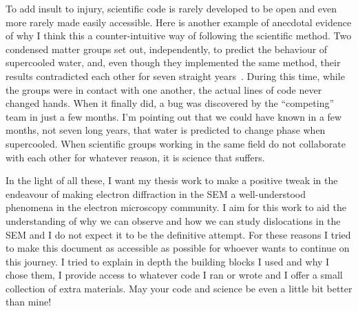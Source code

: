 To add insult to injury, scientific code is rarely developed to be open and even more rarely made easily accessible. Here is another example of anecdotal evidence of why I think this a counter-intuitive way of following the scientific method. Two condensed matter groups set out, independently, to predict the behaviour of supercooled water, and, even though they implemented the same method, their results contradicted each other for seven straight years~\cite{supercool}. During this time, while the groups were in contact with one another, the actual lines of code never changed hands. When it finally did, a bug was discovered by the ``competing'' team in just a few months. I'm pointing out that we could have known in a few months, not seven long years, that water is predicted to change phase when supercooled. When scientific groups working in the same field do not collaborate with each other for whatever reason, it is science that suffers.


In the light of all these, I want my thesis work to make a positive tweak in the endeavour of making electron diffraction in the SEM a well-understood phenomena in the electron microscopy community. I aim for this work to aid the understanding of why we can observe and how we can study dislocations in the SEM and I do not expect it to be the definitive attempt. For these reasons I tried to make this document as accessible as possible for whoever wants to continue on this journey. I tried to explain in depth the building blocks I used and why I chose them, I provide access to whatever code I ran or wrote and I offer a small collection of extra materials. May your code and science be even a little bit better than mine!
%